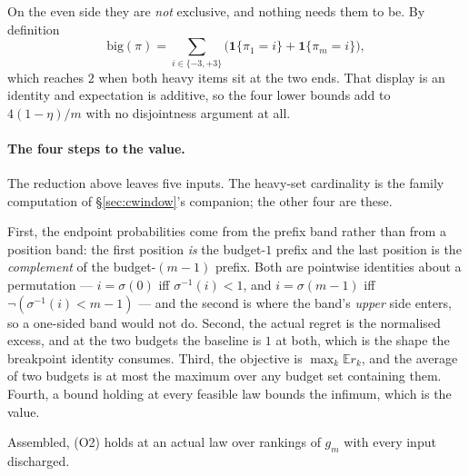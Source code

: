 On the even side they are \emph{not} exclusive, and nothing needs them to be. By definition
\[
\mathrm{big}(\pi)=\sum_{i\in\{-3,+3\}}
\bigl(\mathbf{1}\{\pi_{1}=i\}+\mathbf{1}\{\pi_{m}=i\}\bigr),
\]
which reaches $2$ when both heavy items sit at the two ends. That display is an identity and
expectation is additive, so the four lower bounds add to $4(1-\eta)/m$ with no disjointness
argument at all.


\paragraph{The four steps to the value.}
The reduction above leaves five inputs. The heavy-set cardinality is the family computation
of \S\ref{sec:cwindow}'s companion; the other four are these.

First, the endpoint probabilities come from the prefix band rather than from a position band:
the first position \emph{is} the budget-$1$ prefix and the last position is the
\emph{complement} of the budget-$(m-1)$ prefix. Both are pointwise identities about a
permutation --- $i=\sigma(0)$ iff $\sigma^{-1}(i)<1$, and $i=\sigma(m-1)$ iff
$\neg(\sigma^{-1}(i)<m-1)$ --- and the second is where the band's \emph{upper} side enters, so
a one-sided band would not do. Second, the actual regret is the normalised excess, and at the
two budgets the baseline is $1$ at both, which is the shape the breakpoint identity consumes.
Third, the objective is $\max_{k}\mathbb E r_{k}$, and the average of two budgets is at most
the maximum over any budget set containing them. Fourth, a bound holding at every feasible
law bounds the infimum, which is the value.

Assembled, (O2) holds at an actual law over rankings of $g_{m}$ with every input discharged.


